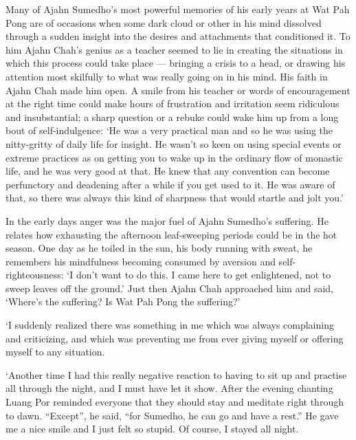 Many of Ajahn Sumedho's most powerful memories of his early years at Wat
Pah Pong are of occasions when some dark cloud or other in his mind
dissolved through a sudden insight into the desires and attachments that
conditioned it. To him Ajahn Chah's genius as a teacher seemed to lie in
creating the situations in which this process could take place ---
bringing a crisis to a head, or drawing his attention most skilfully to
what was really going on in his mind. His faith in Ajahn Chah made him
open. A smile from his teacher or words of encouragement at the right
time could make hours of frustration and irritation seem ridiculous and
insubstantial; a sharp question or a rebuke could wake him up from a
long bout of self-indulgence: `He was a very practical man and so he was
using the nitty-gritty of daily life for insight. He wasn't so keen on
using special events or extreme practices as on getting you to wake up
in the ordinary flow of monastic life, and he was very good at that. He
knew that any convention can become perfunctory and deadening after a
while if you get used to it. He was aware of that, so there was always
this kind of sharpness that would startle and jolt you.'

In the early days anger was the major fuel of Ajahn Sumedho's suffering.
He relates how exhausting the afternoon leaf-sweeping periods could be
in the hot season. One day as he toiled in the sun, his body running
with sweat, he remembers his mindfulness becoming consumed by aversion
and self-righteousness: `I don't want to do this. I came here to get
enlightened, not to sweep leaves off the ground.' Just then Ajahn Chah
approached him and said, `Where's the suffering? Is Wat Pah Pong the
suffering?'

`I suddenly realized there was something in me which was always
complaining and criticizing, and which was preventing me from ever
giving myself or offering myself to any situation.

`Another time I had this really negative reaction to having to sit up
and practise all through the night, and I must have let it show. After
the evening chanting Luang Por reminded everyone that they should stay
and meditate right through to dawn. ``Except'', he said, ``for Sumedho,
he can go and have a rest.'' He gave me a nice smile and I just felt so
stupid. Of course, I stayed all night.

